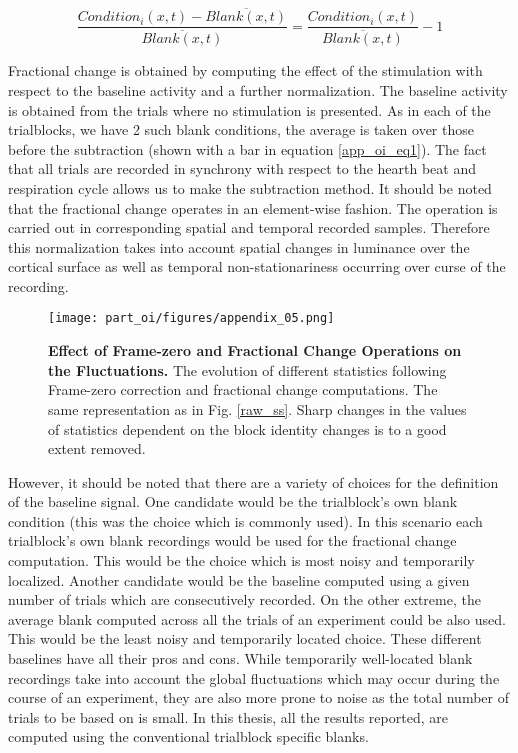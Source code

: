 \begin{equation} \frac{Condition_i(x,t)-\overline{Blank(x,t)}}{\overline{Blank(x,t)}}=
\frac{Condition_i(x,t)}{\overline{Blank(x,t)}}-1 \label{app_oi_eq1}\end{equation} 


Fractional change is obtained by computing the effect of the stimulation
with respect to \newpage the baseline activity and a further normalization. The
baseline activity is obtained from the trials where no stimulation is
presented. As in each of the trialblocks, we have 2 \nolinebreak such \newpage blank conditions,
the average is taken over those before the subtraction (shown with a bar in
equation \ref{app_oi_eq1}). The fact that all trials are recorded in
synchrony with respect to the hearth beat and respiration cycle allows us
to make the subtraction method. It should be noted that the fractional
change operates in an element-wise fashion. The operation is carried out in
corresponding spatial and temporal recorded samples. Therefore this
normalization takes into account spatial changes in luminance over the
cortical surface as well as temporal non-stationariness occurring over
curse of the recording. 


\begin{figure}[!h]
\centerline{\texttt{[image: part\_oi/figures/appendix\_05.png]}}
\caption[Effect of Frame-zero and Fractional Change Operations on the
Fluctuations.]{ \textbf{Effect of Frame-zero and Fractional Change
Operations on the Fluctuations.} The evolution of different statistics
following Frame-zero correction and fractional change computations. The
same representation as in Fig. \ref{raw_ss}. Sharp changes in the values of
statistics dependent on the block identity changes is to a good extent
removed.} \label{f0_ss} \end{figure}

However, it should be noted that there are a variety of choices for the
definition of the baseline signal. One candidate would be the trialblock's
own blank condition (this was the choice which is commonly used). In this
scenario each trialblock's own blank recordings would be used for the
fractional change computation. This would be the choice which is most noisy
and temporarily localized. Another candidate would be the baseline computed
using a given number of trials which are consecutively recorded. On the
other extreme, the average blank computed across all the trials of an
experiment could be also used. This would be the least noisy and
temporarily located choice. These different baselines have all their pros
and cons. While temporarily well-located blank recordings take into account
the global fluctuations which may occur during the course of an experiment,
they are also more prone to noise as the total number of trials to be based
on is small. In this thesis, all the results reported, are computed using
the conventional trialblock specific blanks.

